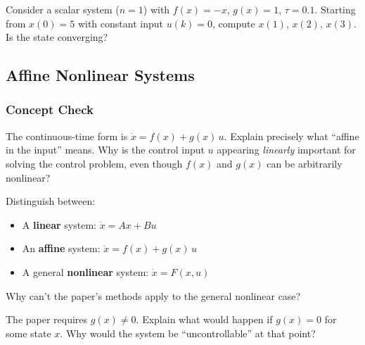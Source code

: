 Consider a scalar system ($n=1$) with $f(x) = -x$, $g(x) = 1$, $\tau = 0.1$. Starting from $x(0) = 5$ with constant input $u(k) = 0$, compute $x(1)$, $x(2)$, $x(3)$. Is the state converging?

\begin{largeanswer}\end{largeanswer}

\subsection{Affine Nonlinear Systems}

\subsubsection*{Concept Check}

The continuous-time form is $\dot{x} = f(x) + g(x)\,u$. Explain precisely what ``affine in the input'' means. Why is the control input $u$ appearing \emph{linearly} important for solving the control problem, even though $f(x)$ and $g(x)$ can be arbitrarily nonlinear?

\begin{answerbox}\end{answerbox}

Distinguish between:
\begin{itemize}[nosep]
  \item A \textbf{linear} system: $\dot{x} = Ax + Bu$
  \item An \textbf{affine} system: $\dot{x} = f(x) + g(x)\,u$
  \item A general \textbf{nonlinear} system: $\dot{x} = F(x, u)$
\end{itemize}
Why can't the paper's methods apply to the general nonlinear case?

\begin{answerbox}\end{answerbox}

The paper requires $g(x) \neq 0$. Explain what would happen if $g(x) = 0$ for some state $x$. Why would the system be ``uncontrollable'' at that point?

\begin{answerbox}\end{answerbox}

